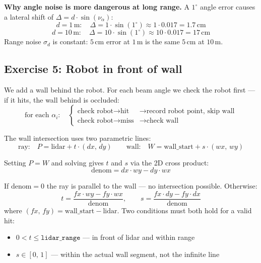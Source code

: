 \documentclass[12pt, a4paper]{article}
\begin{document}
\begin{notebox}
  \textbf{Why angle noise is more dangerous at long range.}
  A $1^\circ$ angle error causes a lateral shift of $\Delta = d\cdot\sin(\nu_\alpha)$:
  \[
    d = 1\,\text{m}:  \quad \Delta = 1 \cdot \sin(1^\circ) \approx 1 \cdot 0.017 = 1.7\,\text{cm}
  \]
  \[
    d = 10\,\text{m}: \quad \Delta = 10 \cdot \sin(1^\circ) \approx 10 \cdot 0.017 = 17\,\text{cm}
  \]
  Range noise $\sigma_d$ is constant: $5\,\text{cm}$ error at $1$\,m is the
  same $5\,\text{cm}$ at $10$\,m.
\end{notebox}

\subsection*{Exercise 5: Robot in front of wall}

We add a wall behind the robot. For each beam angle we check the robot first
--- if it hits, the wall behind is occluded:
\[
  \text{for each } \alpha_i: \quad
  \begin{cases}
    \text{check robot} \rightarrow \text{hit}  & \rightarrow \text{record robot point, skip wall}\\
    \text{check robot} \rightarrow \text{miss} & \rightarrow \text{check wall}
  \end{cases}
\]

The wall intersection uses two parametric lines:
\[
  \text{ray:} \quad P = \text{lidar} + t\cdot(dx,\,dy)
  \qquad
  \text{wall:} \quad W = \text{wall\_start} + s\cdot(wx,\,wy)
\]

Setting $P = W$ and solving gives $t$ and $s$ via the 2D cross product:
\[
  \text{denom} = dx\cdot wy - dy\cdot wx
\]

If $\text{denom} = 0$ the ray is parallel to the wall --- no intersection possible.
Otherwise:
\[
  t = \frac{fx\cdot wy - fy\cdot wx}{\text{denom}}, \qquad
  s = \frac{fx\cdot dy - fy\cdot dx}{\text{denom}}
\]
where $(fx,\,fy) = \text{wall\_start} - \text{lidar}$.
Two conditions must both hold for a valid hit:
\begin{itemize}[leftmargin=1.4em]
  \item $0 < t \leq \texttt{lidar\_range}$ --- in front of lidar and within range
  \item $s \in [0,\,1]$ --- within the actual wall segment, not the infinite line
\end{itemize}
\end{document}
